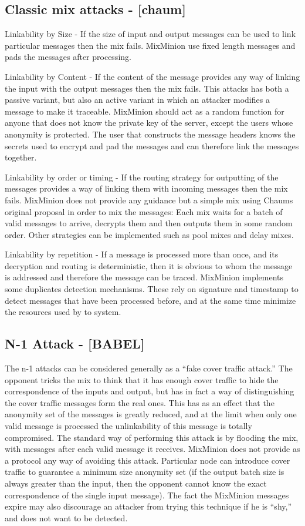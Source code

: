 \documentclass{article}
\begin{document}
\subsection{Classic mix attacks - [chaum]}

Linkability by Size - If the size of input and output messages can be
used to link particular messages then the mix fails. MixMinion use
fixed length messages and pads the messages after processing.

Linkability by Content - If the content of the message provides any
way of linking the input with the output messages then the mix
fails. This attacks has both a passive variant, but also an active
variant in which an attacker modifies a message to make it
traceable. MixMinion should act as a random function for anyone that
does not know the private key of the server, except the users whose
anonymity is protected. The user that constructs the message headers
knows the secrets used to encrypt and pad the messages and can
therefore link the messages together.

Linkability by order or timing - If the routing strategy for
outputting of the messages provides a way of linking them with
incoming messages then the mix fails. MixMinion does not provide any
guidance but a simple mix using Chaums original proposal in order to
mix the messages: Each mix waits for a batch of valid messages to
arrive, decrypts them and then outputs them in some random
order. Other strategies can be implemented such as pool mixes and
delay mixes.

Linkability by repetition - If a message is processed more than once,
and its decryption and routing is deterministic, then it is obvious to
whom the message is addressed and therefore the message can be
traced. MixMinion implements some duplicates detection
mechanisms. These rely on signature and timestamp to
detect messages that have been processed before, and at the same time
minimize the resources used by to system.

\subsection{N-1 Attack - [BABEL]}

The n-1 attacks can be considered generally as a ``fake cover traffic
attack.'' The opponent tricks the mix to think that it has enough cover
traffic to hide the correspondence of the inputs and output, but has
in fact a way of distinguishing the cover traffic messages form the
real ones. This has as an effect that the anonymity set of the
messages is greatly reduced, and at the limit when only one valid
message is processed the unlinkability of this message is totally
compromised. The standard way of performing this attack is by flooding
the mix, with messages after each valid message it receives. MixMinion
does not provide as a protocol any way of avoiding this
attack. Particular node can introduce cover
traffic to guarantee a minimum size anonymity set (if the output batch
size is always greater than the input, then the opponent cannot know
the exact correspondence of the single input message). The fact the
MixMinion messages expire may also discourage an attacker from trying
this technique if he is ``shy,'' and does not want to be detected.
\end{document}
